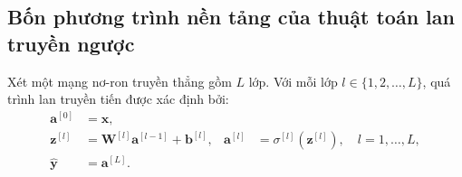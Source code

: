 \subsection{Bốn phương trình nền tảng của thuật toán lan truyền ngược}
Xét một mạng nơ-ron truyền thẳng gồm $L$ lớp. Với mỗi lớp $l \in \{1,2,\dots,L\}$, quá trình lan truyền tiến được xác định bởi:
\begin{equation}
\begin{aligned}
\mathbf a^{[0]}&=\mathbf x,\\
\mathbf z^{[l]}&=\mathbf W^{[l]}\mathbf a^{[l-1]}+\mathbf b^{[l]},
&\mathbf a^{[l]}&=\sigma^{[l]}(\mathbf z^{[l]}),\quad l=1,\ldots,L,\\
\widehat{\mathbf y}&=\mathbf a^{[L]}.
\end{aligned}
\label{eq:bp_forward}
\end{equation}

